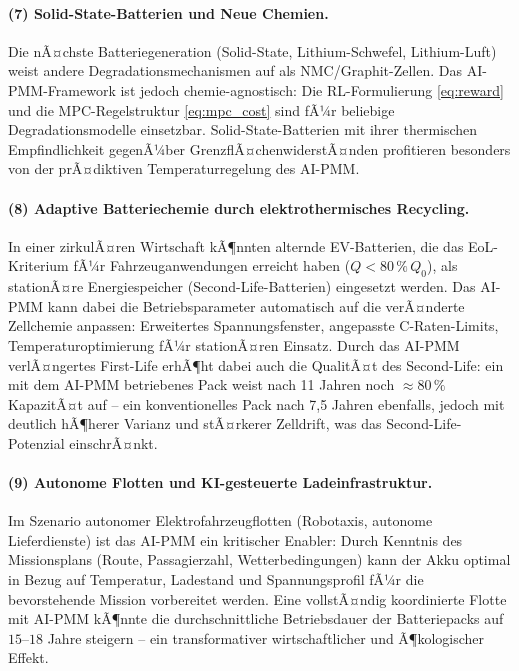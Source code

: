 ﻿\documentclass[12pt,a4paper]{article}
\begin{document}
	\paragraph{(7) Solid-State-Batterien und Neue Chemien.}
	Die nÃ¤chste Batteriegeneration (Solid-State, Lithium-Schwefel, Lithium-Luft)
	weist andere Degradationsmechanismen auf als NMC/Graphit-Zellen. Das
	AI-PMM-Framework ist jedoch chemie-agnostisch: Die RL-Formulierung
	\eqref{eq:reward} und die MPC-Regelstruktur \eqref{eq:mpc_cost} sind
	fÃ¼r beliebige Degradationsmodelle einsetzbar. Solid-State-Batterien mit
	ihrer thermischen Empfindlichkeit gegenÃ¼ber GrenzflÃ¤chenwiderstÃ¤nden
	profitieren besonders von der prÃ¤diktiven Temperaturregelung des AI-PMM.
	
	\paragraph{(8) Adaptive Batteriechemie durch elektro\-thermisches Recycling.}
	In einer zirkulÃ¤ren Wirtschaft kÃ¶nnten alternde EV-Batterien, die das
	EoL-Kriterium fÃ¼r Fahrzeuganwendungen erreicht haben ($Q < 80\,\%\,Q_0$),
	als stationÃ¤re Energiespeicher (Second-Life-Batterien) eingesetzt werden.
	Das AI-PMM kann dabei die Betriebsparameter automatisch auf die verÃ¤nderte
	Zellchemie anpassen: Erweitertes Spannungsfenster, angepasste
	C-Raten-Limits, Temperaturoptimierung fÃ¼r stationÃ¤ren Einsatz. Durch das
	AI-PMM verlÃ¤ngertes First-Life erhÃ¶ht dabei auch die QualitÃ¤t des Second-Life:
	ein mit dem AI-PMM betriebenes Pack weist nach 11 Jahren noch $\approx 80\,\%$
	KapazitÃ¤t auf -- ein konventionelles Pack nach 7{,}5 Jahren ebenfalls,
	jedoch mit deutlich hÃ¶herer Varianz und stÃ¤rkerer Zelldrift, was das
	Second-Life-Potenzial einschrÃ¤nkt.
	
	\paragraph{(9) Autonome Flotten und KI-gesteuerte Ladeinfrastruktur.}
	Im Szenario autonomer Elektrofahrzeugflotten (Robotaxis, autonome Lieferdienste)
	ist das AI-PMM ein kritischer Enabler: Durch Kenntnis des Missionsplans
	(Route, Passagierzahl, Wetterbedingungen) kann der Akku optimal in Bezug
	auf Temperatur, Ladestand und Spannungsprofil fÃ¼r die bevorstehende Mission
	vorbereitet werden. Eine vollstÃ¤ndig koordinierte Flotte mit AI-PMM kÃ¶nnte
	die durchschnittliche Betriebsdauer der Batteriepacks auf
	$15\text{--}18$ Jahre steigern -- ein transformativer wirtschaftlicher
	und Ã¶kologischer Effekt.
	
\end{document}
